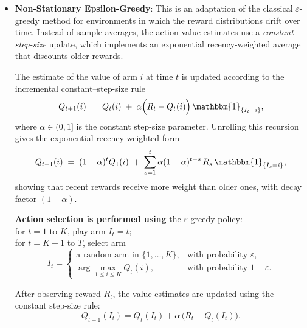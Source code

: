 \documentclass[pdflatex,sn-mathphys-num]{sn-jnl}
\theoremstyle{thmstyleone}%
\theoremstyle{thmstyletwo}%
\theoremstyle{thmstylethree}%
\begin{document}
\begin{itemize}
    After receiving the reward $X_t(a_t)$, the sliding-window statistics are updated by discarding observations older than $\tau$ rounds and inserting the new one:
    \[
        N_{t+1}(\gamma, i)
        = \sum_{s = t-\tau+2}^{t+1} \gamma^{\,t+1-s}\, \mathbbm{1}_{\{I_s = i\}},
    \]
    \[
        \bar{X}_{t+1}(\tau, a)
        = \frac{1}{N_{t+1}(\tau, a)}
          \sum_{s = t-\tau+2}^{t+1} X_s(i)\,\mathbbm{1}_{\{I_s = i\}},
    \]
    \[
        c_{t+1}(\tau, i)
        = B \sqrt{\frac{\xi \log((t+1) \wedge \tau)}{N_{t+1}(\tau, i)}}.
    \]

    \item \textbf{Non-Stationary Epsilon-Greedy}\cite{epsilon_greedy_ns}: 
    This is an adaptation of the classical $\varepsilon$-greedy method for
    environments in which the reward distributions drift over time.  
    Instead of sample averages, the action-value estimates use a
    \emph{constant step-size} update, which implements an
    exponential recency-weighted average that discounts older rewards.

    The estimate of the value of arm $i$ at time $t$ is updated according to
    the incremental constant–step-size rule  
    \[
        Q_{t+1}(i)
        \;=\;
        Q_t(i)
        \;+\;
        \alpha\Big(R_t - Q_t(i)\Big)\,\mathbbm{1}_{\{I_t = i\}},
    \]
    where $\alpha \in (0,1]$ is the constant step-size parameter.  
    Unrolling this recursion gives the exponential recency-weighted form
    \[
        Q_{t+1}(i)
        \;=\;
        (1-\alpha)^{t} Q_1(i)
        \;+\;
        \sum_{s=1}^{t}
        \alpha(1-\alpha)^{t-s}\,R_s\,\mathbbm{1}_{\{I_s=i\}},
    \]
    showing that recent rewards receive more weight than older ones, with
    decay factor $(1-\alpha)$.

    \textbf{Action selection is performed using} the $\varepsilon$-greedy policy:\\
\quad for $t = 1$ to $K$, play arm $I_t = t$;\\
\quad for $t = K+1$ to $T$, select arm
    \[
        I_t
        =
        \begin{cases}
            \text{a random arm in }\{1,\dots,K\}, & \text{with probability }\varepsilon, \\[6pt]
            \displaystyle \arg\max_{1\le i\le K} Q_t(i),     & \text{with probability }1-\varepsilon.
        \end{cases}
    \]

    After observing reward $R_t$, the value estimates are updated using the
    constant step-size rule:
    \[
        Q_{t+1}(I_t)
        =
        Q_t(I_t)
        +
        \alpha\,\big(R_t - Q_t(I_t)\big).
    \]


\end{itemize}
\end{document}
